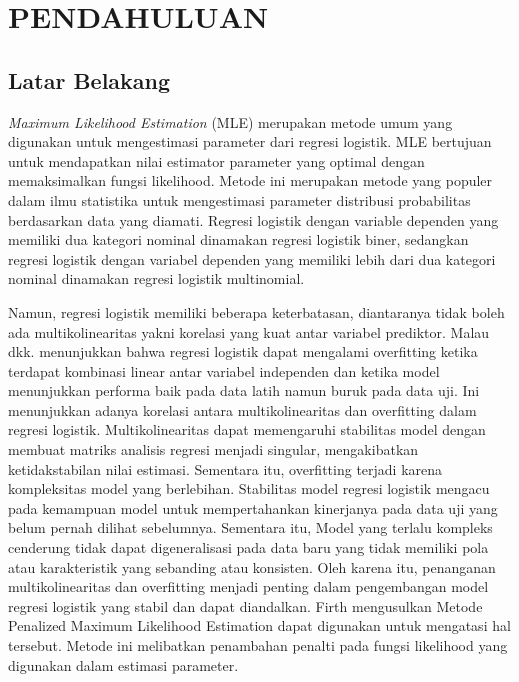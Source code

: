 \pagestyle{plain}
\chapter{PENDAHULUAN}
\thispagestyle{empty}
\onehalfspacing

\section{Latar Belakang}
\textit{Maximum Likelihood Estimation} (MLE) merupakan metode umum yang digunakan untuk mengestimasi parameter dari regresi logistik. MLE bertujuan untuk mendapatkan nilai estimator parameter yang optimal dengan memaksimalkan fungsi likelihood. Metode ini merupakan metode yang populer dalam ilmu statistika untuk mengestimasi parameter distribusi probabilitas berdasarkan data yang diamati. Regresi logistik dengan variable dependen yang memiliki dua kategori nominal dinamakan regresi logistik biner, sedangkan regresi logistik dengan variabel dependen yang memiliki lebih dari dua kategori nominal dinamakan regresi logistik multinomial.

Namun, regresi logistik memiliki beberapa keterbatasan, diantaranya tidak boleh ada multikolinearitas yakni korelasi yang kuat antar variabel prediktor. Malau dkk. \citep*{Malau2023} menunjukkan bahwa regresi logistik dapat mengalami overfitting ketika terdapat kombinasi linear antar variabel independen dan ketika model menunjukkan performa baik pada data latih namun buruk pada data uji. Ini menunjukkan adanya korelasi antara multikolinearitas dan overfitting dalam regresi logistik. Multikolinearitas dapat memengaruhi stabilitas model dengan membuat matriks analisis regresi menjadi singular, mengakibatkan ketidakstabilan nilai estimasi. Sementara itu, overfitting terjadi karena kompleksitas model yang berlebihan. Stabilitas model regresi logistik mengacu pada kemampuan model untuk mempertahankan kinerjanya pada data uji yang belum pernah dilihat sebelumnya. Sementara itu, Model yang terlalu kompleks cenderung tidak dapat digeneralisasi pada data baru yang tidak memiliki pola atau karakteristik yang sebanding atau konsisten. Oleh karena itu, penanganan multikolinearitas dan overfitting menjadi penting dalam pengembangan model regresi logistik yang stabil dan dapat diandalkan. Firth \citep*{Firth1993} mengusulkan Metode Penalized Maximum Likelihood Estimation dapat digunakan untuk mengatasi hal tersebut. Metode ini melibatkan penambahan penalti pada fungsi likelihood yang digunakan dalam estimasi parameter.

